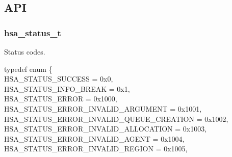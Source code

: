 \documentclass[final,oneside]{book}
\newcommand{\reftyp}[1]{#1}
\newcommand{\refenu}[1]{\reftyp{#1}}
\newenvironment{mylongtable}{\rowcolors{0}{lightgray}{lightgray}\longtable} {
\endlongtable}
\begin{document}
\subsection{API}
\makeatletter{}

\subsubsection{hsa_\-status_\-t}
\vspace{-2.5mm}Status codes.\begin{mylongtable}{@{}p{\textwidth}}
\rule{0pt}{3ex}typedef enum \{\\\hspace{1.7em}\hypertarget{group__status_1ggad755322e7ff95456520e8abdbe90d225ae382ea0c9c05cce5a60d0317375159cc}{\refenu{HSA_\-STATUS_\-SUCCESS}} = 0x0,\\
\hspace{1.7em}\hypertarget{group__status_1ggad755322e7ff95456520e8abdbe90d225a86c476121ca787ff75f6a4676507b221}{\refenu{HSA_\-STATUS_\-INFO_\-BREAK}} = 0x1,\\
\hspace{1.7em}\hypertarget{group__status_1ggad755322e7ff95456520e8abdbe90d225a60edf4d82e4703ff750ea38d619fea88}{\refenu{HSA_\-STATUS_\-ERROR}} = 0x1000,\\
\hspace{1.7em}\hypertarget{group__status_1ggad755322e7ff95456520e8abdbe90d225ac7d3651f75107d2a6a8ba3b25683c030}{\refenu{HSA_\-STATUS_\-ERROR_\-INVALID_\-ARGUMENT}} = 0x1001,\\
\hspace{1.7em}\hypertarget{group__status_1ggad755322e7ff95456520e8abdbe90d225a7b27f50e23a776b496b8b4707f21ccad}{\refenu{HSA_\-STATUS_\-ERROR_\-INVALID_\-QUEUE_\-CREATION}} = 0x1002,\\
\hspace{1.7em}\hypertarget{group__status_1ggad755322e7ff95456520e8abdbe90d225ac818189ff640d38ce13558e72daddb75}{\refenu{HSA_\-STATUS_\-ERROR_\-INVALID_\-ALLOCATION}} = 0x1003,\\
\hspace{1.7em}\hypertarget{group__status_1ggad755322e7ff95456520e8abdbe90d225a3a5d835c109c2d0ad5b9c2771e133e5d}{\refenu{HSA_\-STATUS_\-ERROR_\-INVALID_\-AGENT}} = 0x1004,\\
\hspace{1.7em}\hypertarget{group__status_1ggad755322e7ff95456520e8abdbe90d225ad63594ac02edec7ae7aa7722c11afcd9}{\refenu{HSA_\-STATUS_\-ERROR_\-INVALID_\-REGION}} = 0x1005,\\

\end{mylongtable}
\end{document}

